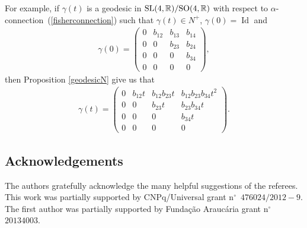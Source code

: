 \documentclass[10pt,a4paper]{amsart}
\numberwithin{equation}{section}
\begin{document}
\begin{Remark}
  For example, if $\gamma(t)$ is a geodesic in ${\rm SL}(4,{\mathbb R})/{\rm SO}(4,{\mathbb R})$ with respect to $\alpha$-con\-nec\-tion~(\ref{fisherconnection}) such that $\gamma(t) \in N^+$, $\gamma(0) = \operatorname{Id}$ and
  \begin{gather*}
    \gamma(0) =
    \left(
    \begin{matrix}
      0      & b_{12} & b_{13} & b_{14} \\
      0      &   0    & b_{23} & b_{24}\\
      0      &   0    &   0    & b_{34}\\
      0      &   0    &   0    & 0
    \end{matrix}
    \right),
  \end{gather*}
  then Proposition \ref{geodesicN} give us that
  \begin{gather*}
    \gamma(t) =
    \left(
    \begin{matrix}
      0      & b_{12}t & b_{12}b_{23}t & b_{12}b_{23}b_{34}t^2 \\
      0      &   0    & b_{23}t & b_{23}b_{34}t\\
      0      &   0    &   0    & b_{34}t\\
      0      &   0    &   0    & 0
    \end{matrix}
    \right).
  \end{gather*}
\end{Remark}

\vspace{-3.5mm}

\subsection*{Acknowledgements}

\vspace{-1mm}

The authors gratefully acknowledge the many helpful suggestions of
the referees.
This work was partially supported by CNPq/Universal grant
n$^{\circ}$~$476024/2012{-}9$. The f\/irst author was partially
supported by Funda\c{c}\~{a}o Arauc\'{a}ria grant  n$^{\circ}$~$20134003$.

\vspace{-2.5mm}

\end{document}
